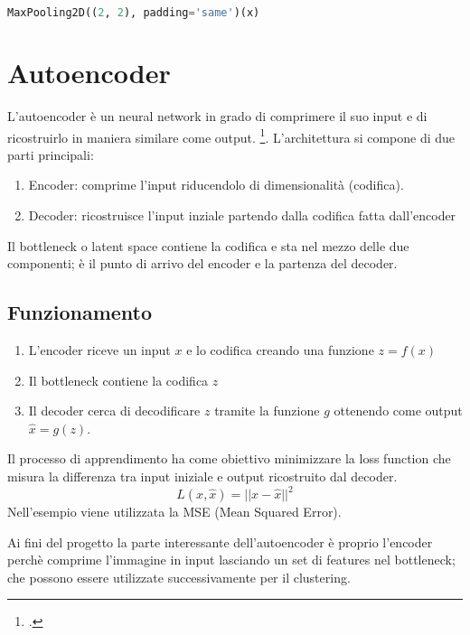 \begin{lstlisting}[language=Python, frame=none]
    MaxPooling2D((2, 2), padding='same')(x)
\end{lstlisting}

\section{Autoencoder}
L'autoencoder è un neural network in grado di comprimere il suo input e di ricostruirlo in maniera similare come output. \footcite[p.~499]{Goodfellow-et-al-2016}.
L'architettura si compone di due parti principali:
\begin{enumerate}
    \item Encoder: comprime l'input riducendolo di dimensionalità (codifica).
    \item Decoder: ricostruisce l'input inziale partendo dalla codifica fatta dall'encoder
\end{enumerate}
Il bottleneck o latent space contiene la codifica e sta nel mezzo delle due componenti; è il punto di arrivo del encoder e la partenza del decoder.

\subsection{Funzionamento}
\begin{enumerate}
    \item L'encoder riceve un input \( x \) e lo codifica creando una funzione \( z= f(x) \)
    \item Il bottleneck contiene la codifica \( z \)
    \item Il decoder cerca di decodificare \( z \) tramite la funzione \( g \) ottenendo come output \( \hat{x} = g(z) \).
\end{enumerate}

Il processo di apprendimento ha come obiettivo minimizzare la loss function che misura la differenza tra input iniziale e output ricostruito dal decoder.
\[ L(x, \hat{x}) = ||x - \hat{x}||^2 \]
Nell'esempio viene utilizzata la MSE (Mean Squared Error).

Ai fini del progetto la parte interessante dell'autoencoder è proprio l'encoder perchè comprime l'immagine in input lasciando un set di features nel bottleneck; che possono essere utilizzate successivamente per il clustering.







